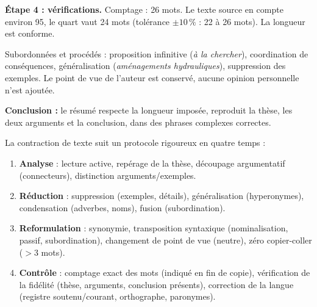 \documentclass[11pt]{article}
\begin{document}
\begin{exoresolu}
\textbf{Étape 4 : vérifications.} Comptage : 26 mots. Le texte source en compte environ 95, le quart vaut 24 mots (tolérance $\pm 10\,\%$ : 22 à 26 mots). La longueur est conforme.

Subordonnées et procédés : proposition infinitive (\emph{à la chercher}), coordination de conséquences, généralisation (\emph{aménagements hydrauliques}), suppression des exemples. Le point de vue de l'auteur est conservé, aucune opinion personnelle n'est ajoutée.

\textbf{Conclusion :} le résumé respecte la longueur imposée, reproduit la thèse, les deux arguments et la conclusion, dans des phrases complexes correctes.
\end{exoresolu}

\begin{aretenir}
La contraction de texte suit un protocole rigoureux en quatre temps :
\begin{enumerate}
\item \textbf{Analyse} : lecture active, repérage de la thèse, découpage argumentatif (connecteurs), distinction arguments/exemples.
\item \textbf{Réduction} : suppression (exemples, détails), généralisation (hyperonymes), condensation (adverbes, noms), fusion (subordination).
\item \textbf{Reformulation} : synonymie, transposition syntaxique (nominalisation, passif, subordination), changement de point de vue (neutre), zéro copier-coller ($>3$ mots).
\item \textbf{Contrôle} : comptage exact des mots (indiqué en fin de copie), vérification de la fidélité (thèse, arguments, conclusion présents), correction de la langue (registre soutenu/courant, orthographe, paronymes).
\end{enumerate}
\end{aretenir}
\end{document}
